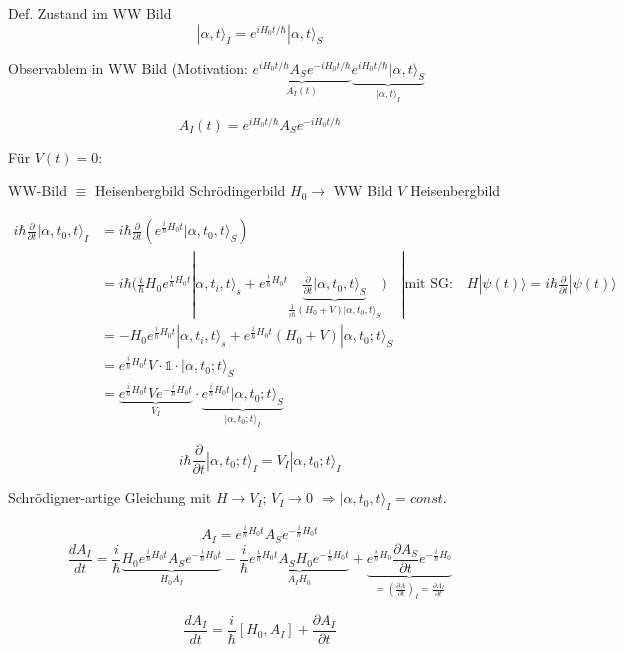 Def. Zustand im WW Bild
\[ |\alpha,t\rangle_I = e^{iH_0t/\hbar}|\alpha,t\rangle_S\]

Observablem in WW Bild (Motivation: \(\underbrace{e^{iH_0t/\hbar} A_S e^{-iH_0t/\hbar}}_{A_I(t)} \underbrace{e^{iH_0t/\hbar}|\alpha,t\rangle_S}_{|\alpha,t\rangle_I}\)

\[ A_I(t) =  e^{iH_0t/\hbar} A_S e^{-iH_0t/\hbar} \]

Für \(V(t)=0\):

WW-Bild \(\equiv\) Heisenbergbild Schrödingerbild \(H_0\rightarrow\) WW Bild \(V\) Heisenbergbild

\begin{align} 
i\hbar \frac{\partial}{\partial t}|\alpha,t_0,t\rangle_I &= i\hbar \frac{\partial}{\partial t}(e^{\frac{i}{\hbar}H_0t}|\alpha,t_0,t\rangle_S)\\
&= i\hbar(\frac{i}{\hbar}H_0 e^{\frac{i}{\hbar}H_0 t}|\alpha,t_i,t\rangle_s +  e^{\frac{i}{\hbar}H_0t}\underbrace{\frac{\partial}{\partial t}|\alpha,t_0,t\rangle_S}_{\frac{1}{i\hbar}(H_0+V)|\alpha,t_0,t\rangle_S} ) \quad |\text{mit SG:}\quad H|\psi(t)\rangle=i\hbar \frac{\partial}{\partial t}|\psi(t)\rangle    \\
&= -H_0 e^{\frac{i}{\hbar}H_0 t}|\alpha,t_i,t\rangle_s + e^{\frac{i}{\hbar}H_0t}(H_0+V)|\alpha,t_0;t\rangle_S\\
&= e^{\frac{i}{\hbar}H_0t}V\cdot\mathbb 1\cdot|\alpha,t_0;t\rangle_S\\
&= \underbrace{e^{\frac{i}{\hbar}H_0t}Ve^{-\frac{i}{\hbar}H_0t}}_{V_I}\cdot \underbrace{e^{\frac{i}{\hbar}H_0t}|\alpha,t_0;t\rangle_S}_{|\alpha,t_0;t\rangle_I}
\end{align}



\[\boxed{i\hbar \frac{\partial}{\partial t} |\alpha,t_0;t\rangle_I = V_I|\alpha,t_0;t\rangle_I}\]

Schrödigner-artige Gleichung mit \(H\rightarrow V_I\); \(V_I\rightarrow 0\) \(\Rightarrow |\alpha,t_0,t\rangle_I=const.\)

\[A_I = e^{\frac{i}{\hbar}H_0t}A_Se^{-\frac{i}{\hbar}H_0t}\]
\[\frac{d A_I}{d t} = \frac{i}{\hbar} \underbrace{H_0e^{\frac{i}{\hbar}H_0t} A_Se^{-\frac{i}{\hbar}H_0t} }_{H_0A_I} -  \frac{i}{\hbar} \underbrace{e^{\frac{i}{\hbar}H_0t}A_S H_0e^{-\frac{i}{\hbar}H_0t}}_{A_I H_0}+\underbrace{e^{\frac{i}{\hbar}H_0} \frac{\partial A_S}{\partial t} e^{-\frac{i}{\hbar}H_0}}_{=\left(\frac{\partial A}{\partial t}\right)_I=\frac{\partial A_I}{\partial t}}\]

\[\frac{dA_I}{dt} = \frac{i}{\hbar}[H_0,A_I]+ \frac{\partial A_I}{\partial t}\]

